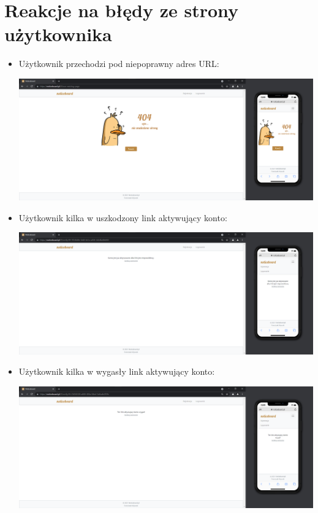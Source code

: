 \documentclass{article}
\begin{document}
    \section{Reakcje na błędy ze strony użytkownika}
    \begin{itemize}
        \item Użytkownik przechodzi pod niepoprawny adres URL:
                    \begin{center}
                    \centering  \includegraphics[width=15.5cm]{NieIstniejącaStrona.png}
            \end{center}
        \item Użytkownik kilka w uszkodzony link aktywujący konto:
                    \begin{center}
                    \centering  \includegraphics[width=15.5cm]{KlikniecieWNiepoprawnyLink.png}
            \end{center}
        \item Użytkownik kilka w wygasły link aktywujący konto:
            \begin{center}
                    \centering  \includegraphics[width=15.5cm]{KliknięcieWWygaśniętyLink.png}
            \end{center}
            

\end{itemize}
\end{document}
